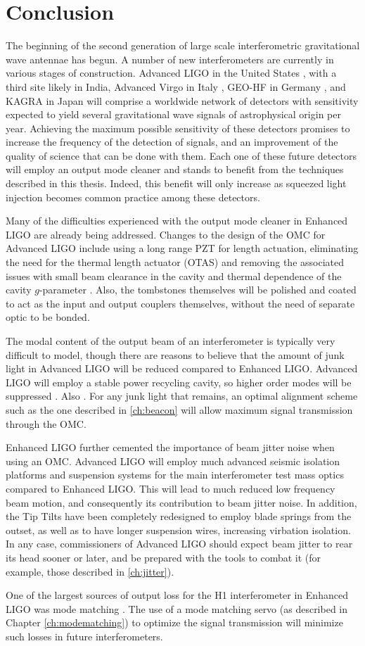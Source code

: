 \chapter{Conclusion}
\label{ch:conclusion}

The beginning of the second generation of large scale interferometric gravitational wave antennae has begun. %
A number of new interferometers are currently in various stages of construction. %
Advanced LIGO in the United States , with a third site likely in India, Advanced Virgo in Italy , GEO-HF in Germany , and KAGRA in Japan  will comprise a worldwide network of detectors with sensitivity expected to yield several gravitational wave signals of astrophysical origin per year. %
Achieving the maximum possible sensitivity of these detectors promises to increase the frequency of the detection of signals, and an improvement of the quality of science that can be done with them. %
Each one of these future detectors will employ an output mode cleaner and stands to benefit from the techniques described in this thesis. %
Indeed, this benefit will only increase as squeezed light injection becomes common practice among these detectors.

Many of the difficulties experienced with the output mode cleaner in Enhanced LIGO are already being addressed. %
Changes to the design of the OMC for Advanced LIGO include using a long range PZT for length actuation, eliminating the need for the thermal length actuator (OTAS) and removing the associated issues with small beam clearance in the cavity and thermal dependence of the cavity $g$-parameter \cite{T1000276,T0900157}. %
Also, the tombstones themselves will be polished and coated to act as the input and output couplers themselves, without the need of separate optic to be bonded. %
 

The modal content of the output beam of an interferometer is typically very difficult to model, though there are reasons to believe that the amount of junk light in Advanced LIGO will be reduced compared to Enhanced LIGO. %
Advanced LIGO will employ a stable power recycling cavity, so higher order modes will be suppressed \cite{T080208}. %
Also . %
For any junk light that remains, an optimal alignment scheme such as the one described in \ref{ch:beacon} will allow maximum signal transmission through the OMC.

Enhanced LIGO further cemented the importance of beam jitter noise when using an OMC. %
Advanced LIGO will employ much advanced seismic isolation platforms \cite{BSCISI} and suspension systems \cite{quaddesign} for the main interferometer test mass optics compared to Enhanced LIGO. %
This will lead to much reduced low frequency beam motion, and consequently its contribution to beam jitter noise. %
In addition, the Tip Tilts have been completely redesigned to employ blade springs from the outset, as well as to have longer suspension wires, increasing virbation isolation. %
In any case, commissioners of Advanced LIGO should expect beam jitter to rear its head sooner or later, and be prepared with the tools to combat it (for example, those described in \ref{ch:jitter}).

One of the largest sources of output loss for the H1 interferometer in Enhanced LIGO was mode matching \cite{Tobin}. %
The use of a mode matching servo (as described in Chapter \ref{ch:modematching}) to optimize the signal transmission will minimize such losses in future interferometers.


